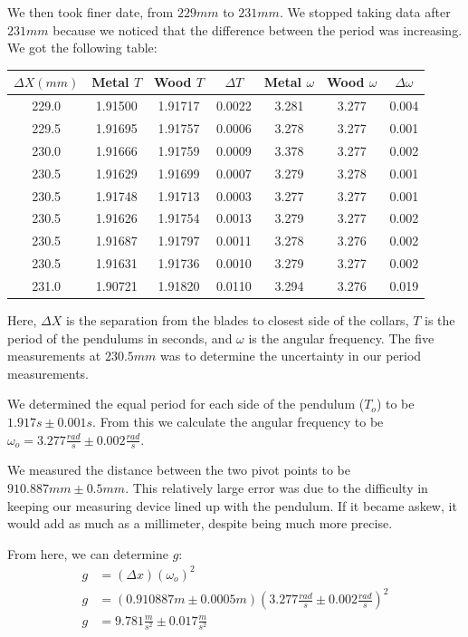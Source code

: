 We then took finer date, from $229mm$ to $231mm$. We stopped taking data after $231mm$ because we noticed that the difference between the period was increasing. We got the following table:
\begin{center}
\begin{tabular}{||c||c|c|c||c|c|c||}
\hline 
$\Delta X(mm)$ & Metal $T$ & Wood $T$ & $\Delta T$ & Metal $\omega$ & Wood $\omega$ & $\Delta \omega$ \\
\hline
229.0	& 1.91500	&	1.91717	&	0.0022	&	3.281	&	3.277	&	0.004\\
\hline
229.5	& 1.91695	&	1.91757	&	0.0006	&	3.278	&	3.277	&	0.001\\
\hline
230.0	& 1.91666	&	1.91759	&	0.0009	&	3.378	&	3.277	&	0.002\\
\hline
230.5	& 1.91629	&	1.91699	&	0.0007	&	3.279	&	3.278	&	0.001\\
230.5	& 1.91748	&	1.91713	&	0.0003	&	3.277	&	3.277	&	0.001\\
230.5	& 1.91626	&	1.91754	&	0.0013	&	3.279	&	3.277	&	0.002\\
230.5	& 1.91687	&	1.91797	&	0.0011	&	3.278	&	3.276	&	0.002\\
230.5	& 1.91631	&	1.91736	&	0.0010	&	3.279	&	3.277	&	0.002\\
\hline
231.0	& 1.90721	&	1.91820	&	0.0110	&	3.294	&	3.276	&	0.019\\
\hline
\end{tabular}
\label{tab:FineData}
\end{center}
Here, $\Delta X$ is the separation from the blades to closest side of the collars, $T$ is the period of the pendulums in seconds, and $\omega$ is the angular frequency. The five measurements at $230.5mm$ was to determine the uncertainty in our period measurements. 

We determined the equal period for each side of the pendulum ($T_o$) to be $1.917s \pm 0.001s$. From this we calculate the angular frequency to be $\omega_o = 3.277 \frac{rad}{s} \pm 0.002 \frac{rad}{s}$.

We measured the distance between the two pivot points to be $910.887mm \pm 0.5mm$. This relatively large error was due to the difficulty in keeping our measuring device lined up with the pendulum. If it became askew, it would add as much as a millimeter, despite being much more precise. 

From here, we can determine $g$:
\begin{align}
g&=(\Delta x) (\omega_o)^2\\
g&=(0.910887m \pm 0.0005m)(3.277 \frac{rad}{s} \pm 0.002 \frac{rad}{s})^2 \\
g&=9.781 \frac{m}{s^2} \pm 0.017 \frac{m}{s^2}
\end{align}

